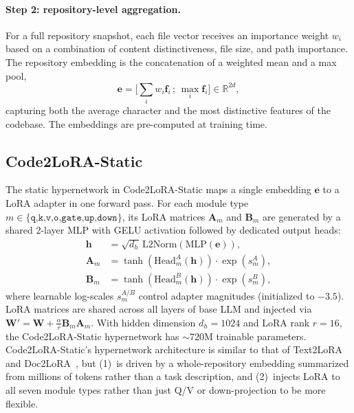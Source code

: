 \documentclass{llmxive}
\providecommand{\codelora}{Code2LoRA\xspace}
\providecommand{\codelorastatic}{\codelora-Static\xspace}
\providecommand{\textlora}{Text2LoRA\xspace}
\providecommand{\doclora}{Doc2LoRA\xspace}
\begin{document}
\paragraph{Step 2: repository-level aggregation.}
For a full repository snapshot, each file vector receives an importance weight $w_i$ based on a combination of content distinctiveness, file size, and path importance.
The repository embedding is the concatenation of a weighted mean and a max pool,
\begin{equation*}
\mathbf{e} = \big[\textstyle\sum_i w_i \mathbf{f}_i \,;\, \max_i \mathbf{f}_i\big] \in \mathbb{R}^{2d},
\end{equation*}
capturing both the average character and the most distinctive features of the codebase.
The embeddings are pre-computed at training time.

\subsection{\codelorastatic{}}
\label{sec:method:static}

The static hypernetwork in \codelorastatic{} maps a single embedding $\mathbf{e}$ to a LoRA adapter in one forward pass.
For each module type $m \in \{\texttt{q,k,v,o,gate,up,down}\}$, its LoRA matrices $\mathbf{A}_m$ and $\mathbf{B}_m$ are generated by a shared 2-layer MLP with GELU activation followed by dedicated output heads:
\begin{align*}
\mathbf{h} &= \sqrt{d_h}\,\mathrm{L2Norm}(\mathrm{MLP}(\mathbf{e})), \\
\mathbf{A}_m &= \tanh(\mathrm{Head}^A_m(\mathbf{h})) \cdot \exp(s^A_m),\\
\mathbf{B}_m &= \tanh(\mathrm{Head}^B_m(\mathbf{h})) \cdot \exp(s^B_m),
\end{align*}
where
learnable log-scales $s^{A/B}_m$ control adapter magnitudes (initialized to $-3.5$).
LoRA matrices are shared across all layers of base LLM and injected via $\mathbf{W}' = \mathbf{W} + \tfrac{\alpha}{r}\mathbf{B}_m\mathbf{A}_m$.
With hidden dimension $d_h{=}1024$ and LoRA rank $r{=}16$, the \codelorastatic{} hypernetwork has ${\sim}$720M trainable parameters.
\codelorastatic{}'s hypernetwork architecture is similar to that of \textlora{}~\cite{charakorn2025text2lora} and \doclora{}~\cite{charakorn2026doctolora}, but (1)~is driven by a whole-repository embedding summarized from millions of tokens rather than a task description, and (2)~injects LoRA to all seven module types rather than just Q/V or down-projection to be more flexible.
\end{document}
